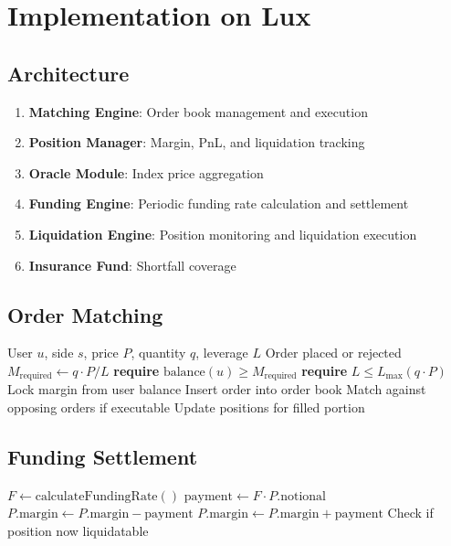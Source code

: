 \documentclass[11pt,a4paper]{article}
\theoremstyle{definition}
\begin{document}
\section{Implementation on Lux}

\subsection{Architecture}

\begin{enumerate}
\item \textbf{Matching Engine}: Order book management and execution
\item \textbf{Position Manager}: Margin, PnL, and liquidation tracking
\item \textbf{Oracle Module}: Index price aggregation
\item \textbf{Funding Engine}: Periodic funding rate calculation and settlement
\item \textbf{Liquidation Engine}: Position monitoring and liquidation execution
\item \textbf{Insurance Fund}: Shortfall coverage
\end{enumerate}

\subsection{Order Matching}

\begin{algorithm}
\caption{Place Limit Order}
\begin{algorithmic}[1]
\Require User $u$, side $s$, price $P$, quantity $q$, leverage $L$
\Ensure Order placed or rejected
\State $M_{\text{required}} \gets q \cdot P / L$
\State \textbf{require} $\text{balance}(u) \geq M_{\text{required}}$
\State \textbf{require} $L \leq L_{\max}(q \cdot P)$
\State Lock margin from user balance
\State Insert order into order book
\State Match against opposing orders if executable
\State Update positions for filled portion
\end{algorithmic}
\end{algorithm}

\subsection{Funding Settlement}

\begin{algorithm}
\caption{Settle Funding (every 8 hours)}
\begin{algorithmic}[1]
\State $F \gets \text{calculateFundingRate}()$
\State $\text{payment} \gets F \cdot P.\text{notional}$
\State $P.\text{margin} \gets P.\text{margin} - \text{payment}$
\Else
\State $P.\text{margin} \gets P.\text{margin} + \text{payment}$
\EndIf
\State Check if position now liquidatable
\EndFor
\end{algorithmic}
\end{algorithm}
\end{document}
